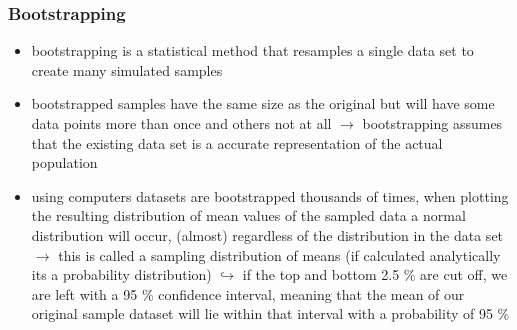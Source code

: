 \documentclass[12pt,a4paper]{article}
\begin{document}
\subsubsection{Bootstrapping} %
\label{ssub:bootstrapping}
\begin{itemize}
  \item bootstrapping is a statistical method that resamples a single data set to create many simulated samples
  \item bootstrapped samples have the same size as the original but will have some data points more than once and others not at all
  \newline \indent $\longrightarrow$ bootstrapping assumes that the existing data set is a accurate representation of the actual population
  \item using computers datasets are bootstrapped thousands of times, when plotting the resulting distribution of mean values of the sampled data a normal distribution will occur, (almost) regardless of the distribution in the data set
  \newline \indent $\longrightarrow$ this is called a sampling distribution of means (if calculated analytically its a probability distribution)
  \newline \indent $\hookrightarrow$ if the top and bottom 2.5 \% are cut off, we are left with a 95 \% confidence interval, meaning that the mean of our original sample dataset will lie within that interval with a probability of 95 \% 
\end{itemize}
\end{document}
